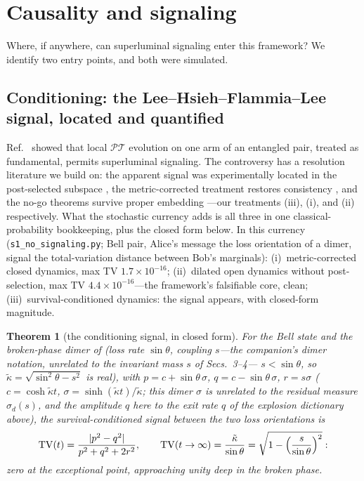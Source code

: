 \documentclass[11pt]{article}
\newtheorem{theorem}{Theorem}[section]
\theoremstyle{definition}
\theoremstyle{remark}
\newcommand{\PT}{\mathcal{PT}}
\begin{document}
\section{Causality and signaling}
\label{sec:causality}

Where, if anywhere, can superluminal signaling enter this framework?
We identify two entry points, and both were simulated.

\subsection{Conditioning: the Lee--Hsieh--Flammia--Lee signal,
located and quantified}

Ref.~\cite{LHFL2014} showed that local $\PT$ evolution on one arm of
an entangled pair, treated as fundamental, permits superluminal
signaling. The controversy has a resolution literature we build on:
the apparent signal was experimentally located in the post-selected
subspace \cite{Tang2016}, the metric-corrected treatment restores
consistency \cite{Brody2016}, and the no-go theorems survive proper
embedding \cite{Ju2019}---our treatments (iii), (i), and (ii)
respectively. What the stochastic currency adds is all three in one
classical-probability bookkeeping, plus the closed form below. In
this currency
(\texttt{s1\_no\_signaling.py}; Bell pair, Alice's message the loss
orientation of a dimer, signal the total-variation distance between
Bob's marginals): (i)~metric-corrected closed dynamics, max TV
$1.7\times10^{-16}$; (ii)~dilated open dynamics without
post-selection, max TV $4.4\times10^{-16}$---the framework's
falsifiable core, clean; (iii)~survival-conditioned dynamics: the
signal appears, with closed-form magnitude.

\begin{theorem}[the conditioning signal, in closed form]
\label{thm:lhfl}
For the Bell state and the broken-phase dimer of \cite{indivisible}
(loss rate $\sin\theta$, coupling $s$---the companion's dimer
notation, unrelated to the invariant mass $s$ of Secs.~3--4---%
$s<\sin\theta$, so $\tilde\kappa=\sqrt{\sin^{2}\theta-s^{2}}$ is real), with
$p=c+\sin\theta\,\sigma$, $q=c-\sin\theta\,\sigma$, $r=s\sigma$
($c=\cosh\tilde\kappa t$, $\sigma=\sinh(\tilde\kappa t)/\tilde\kappa$;
this dimer $\sigma$ is unrelated to the residual measure $\sigma_d(s)$,
and the amplitude $q$ here to the exit rate $q$ of the explosion
dictionary above),
the survival-conditioned signal between the two loss orientations is
\begin{equation}
\mathrm{TV}(t)=\frac{|p^{2}-q^{2}|}{p^{2}+q^{2}+2r^{2}},
\qquad
\mathrm{TV}(t\to\infty)=\frac{\tilde\kappa}{\sin\theta}
=\sqrt{1-\Bigl(\frac{s}{\sin\theta}\Bigr)^{2}} :
\label{eq:lhfl}
\end{equation}
zero at the exceptional point, approaching unity deep in the broken
phase.
\end{theorem}
\end{document}
